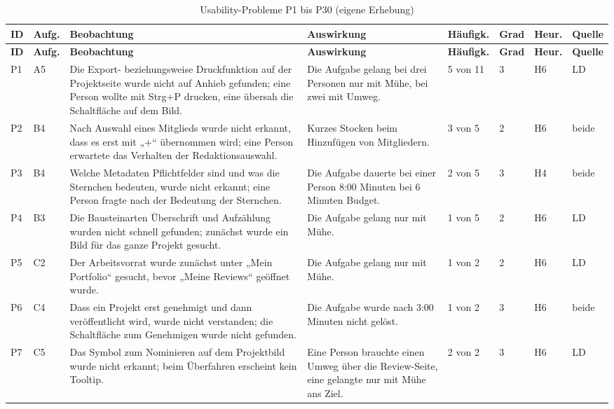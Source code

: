 \begingroup
\scriptsize
\setlength{\tabcolsep}{3pt}
\renewcommand{\arraystretch}{1.1}
\setlength{\LTcapwidth}{\textwidth}
\begin{longtable}{@{}L{0.6cm}L{0.8cm}L{4.9cm}L{4.0cm}L{1.2cm}L{0.7cm}L{0.7cm}L{0.8cm}@{}}
	\caption[Usability-Probleme P1 bis P30]{Usability-Probleme P1 bis P30 (eigene Erhebung)}
	\label{tab:problemliste}\\
	\toprule
	\textbf{ID} & \textbf{Aufg.} & \textbf{Beobachtung} & \textbf{Auswirkung} & \textbf{Häufigk.} & \textbf{Grad} & \textbf{Heur.} & \textbf{Quelle} \\
	\midrule
	\endfirsthead
	\toprule
	\textbf{ID} & \textbf{Aufg.} & \textbf{Beobachtung} & \textbf{Auswirkung} & \textbf{Häufigk.} & \textbf{Grad} & \textbf{Heur.} & \textbf{Quelle} \\
	\midrule
	\endhead
	\bottomrule
	\endfoot
	P1 & A5 & Die Export- beziehungsweise Druckfunktion auf der Projektseite wurde nicht auf Anhieb gefunden; eine Person wollte mit Strg+P drucken, eine übersah die Schaltfläche auf dem Bild. & Die Aufgabe gelang bei drei Personen nur mit Mühe, bei zwei mit Umweg. & 5 von 11 & 3 & H6 & LD \\
	P2 & B4 & Nach Auswahl eines Mitglieds wurde nicht erkannt, dass es erst mit „+“ übernommen wird; eine Person erwartete das Verhalten der Redaktionsauswahl. & Kurzes Stocken beim Hinzufügen von Mitgliedern. & 3 von 5 & 2 & H6 & beide \\
	P3 & B4 & Welche Metadaten Pflichtfelder sind und was die Sternchen bedeuten, wurde nicht erkannt; eine Person fragte nach der Bedeutung der Sternchen. & Die Aufgabe dauerte bei einer Person 8:00 Minuten bei 6 Minuten Budget. & 2 von 5 & 3 & H4 & beide \\
	P4 & B3 & Die Bausteinarten Überschrift und Aufzählung wurden nicht schnell gefunden; zunächst wurde ein Bild für das ganze Projekt gesucht. & Die Aufgabe gelang nur mit Mühe. & 1 von 5 & 2 & H6 & LD \\
	P5 & C2 & Der Arbeitsvorrat wurde zunächst unter „Mein Portfolio“ gesucht, bevor „Meine Reviews“ geöffnet wurde. & Die Aufgabe gelang nur mit Mühe. & 1 von 2 & 2 & H6 & LD \\
	P6 & C4 & Dass ein Projekt erst genehmigt und dann veröffentlicht wird, wurde nicht verstanden; die Schaltfläche zum Genehmigen wurde nicht gefunden. & Die Aufgabe wurde nach 3:00 Minuten nicht gelöst. & 1 von 2 & 3 & H6 & beide \\
	P7 & C5 & Das Symbol zum Nominieren auf dem Projektbild wurde nicht erkannt; beim Überfahren erscheint kein Tooltip. & Eine Person brauchte einen Umweg über die Review-Seite, eine gelangte nur mit Mühe ans Ziel. & 2 von 2 & 3 & H6 & LD \\

\end{longtable}
